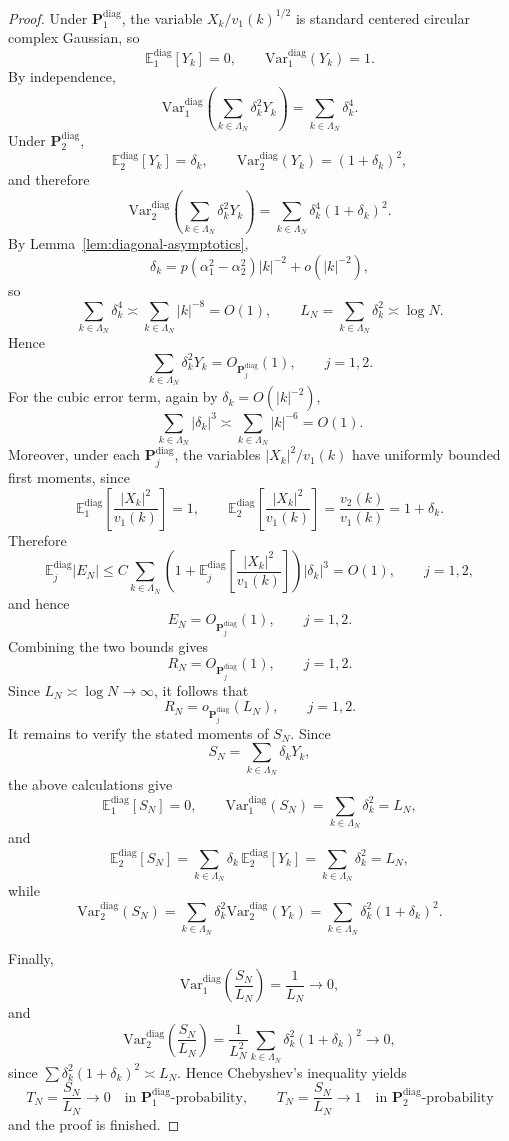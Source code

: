 \documentclass[11pt, reqno]{amsart}
\theoremstyle{remark}
\newcommand{\E}{\mathbb{E}}
\newcommand{\1}{\mathbf{1}}
\newcommand{\Var}{\mathrm{Var}}
\begin{document}
\begin{proof}
Under \(\mathbf P_1^{\mathrm{diag}}\), the variable \(X_k/v_1(k)^{1/2}\) is
standard centered circular complex Gaussian, so
\[
\E_1^{\mathrm{diag}}[Y_k]=0,
\qquad
\Var_1^{\mathrm{diag}}(Y_k)=1.
\]
By independence,
\[
\Var_1^{\mathrm{diag}}\!\left(\sum_{k\in\Lambda_N}\delta_k^2Y_k\right)
=
\sum_{k\in\Lambda_N}\delta_k^4.
\]
Under \(\mathbf P_2^{\mathrm{diag}}\),
\[
\E_2^{\mathrm{diag}}[Y_k]=\delta_k,
\qquad
\Var_2^{\mathrm{diag}}(Y_k)=(1+\delta_k)^2,
\]
and therefore
\[
\Var_2^{\mathrm{diag}}\!\left(\sum_{k\in\Lambda_N}\delta_k^2Y_k\right)
=
\sum_{k\in\Lambda_N}\delta_k^4(1+\delta_k)^2.
\]
By Lemma~\ref{lem:diagonal-asymptotics},
\[
\delta_k=p(\alpha_1^2-\alpha_2^2)|k|^{-2}+o(|k|^{-2}),
\]
so
\[
\sum_{k\in\Lambda_N}\delta_k^4
\asymp
\sum_{k\in\Lambda_N}|k|^{-8}
=O(1),
\qquad
L_N=\sum_{k\in\Lambda_N}\delta_k^2\asymp \log N.
\]
Hence
\[
\sum_{k\in\Lambda_N}\delta_k^2Y_k
=
O_{\mathbf P_j^{\mathrm{diag}}}(1),
\qquad j=1,2.
\]
For the cubic error term, again by \(\delta_k=O(|k|^{-2})\),
\[
\sum_{k\in\Lambda_N}|\delta_k|^3
\asymp
\sum_{k\in\Lambda_N}|k|^{-6}
=
O(1).
\]
Moreover, under each \(\mathbf P_j^{\mathrm{diag}}\), the variables
\(|X_k|^2/v_1(k)\) have uniformly bounded first moments, since
\[
\E_1^{\mathrm{diag}}\!\left[\frac{|X_k|^2}{v_1(k)}\right]=1,
\qquad
\E_2^{\mathrm{diag}}\!\left[\frac{|X_k|^2}{v_1(k)}\right]
=
\frac{v_2(k)}{v_1(k)}=1+\delta_k.
\]
Therefore
\[
\E_j^{\mathrm{diag}}|E_N|
\le
C\sum_{k\in\Lambda_N}
\left(1+\E_j^{\mathrm{diag}}\!\left[\frac{|X_k|^2}{v_1(k)}\right]\right)|\delta_k|^3
=O(1),
\qquad j=1,2,
\]
and hence
\[
E_N=O_{\mathbf P_j^{\mathrm{diag}}}(1),
\qquad j=1,2.
\]
Combining the two bounds gives
\[
R_N=O_{\mathbf P_j^{\mathrm{diag}}}(1),
\qquad j=1,2.
\]
Since \(L_N\asymp \log N\to\infty\), it follows that
\[
R_N=o_{\mathbf P_j^{\mathrm{diag}}}(L_N),
\qquad j=1,2.
\]
It remains to verify the stated moments of \(S_N\). Since
\[
S_N=\sum_{k\in\Lambda_N}\delta_kY_k,
\]
the above calculations give
\[
\E_1^{\mathrm{diag}}[S_N]=0,
\qquad
\Var_1^{\mathrm{diag}}(S_N)=\sum_{k\in\Lambda_N}\delta_k^2=L_N,
\]
and
\[
\E_2^{\mathrm{diag}}[S_N]
=
\sum_{k\in\Lambda_N}\delta_k\,\E_2^{\mathrm{diag}}[Y_k]
=
\sum_{k\in\Lambda_N}\delta_k^2
=
L_N,
\]
while
\[
\Var_2^{\mathrm{diag}}(S_N)
=
\sum_{k\in\Lambda_N}\delta_k^2\Var_2^{\mathrm{diag}}(Y_k)
=
\sum_{k\in\Lambda_N}\delta_k^2(1+\delta_k)^2.
\]

Finally,
\[
\Var_1^{\mathrm{diag}}\!\left(\frac{S_N}{L_N}\right)=\frac1{L_N}\to0,
\]
and
\[
\Var_2^{\mathrm{diag}}\!\left(\frac{S_N}{L_N}\right)
=
\frac{1}{L_N^2}\sum_{k\in\Lambda_N}\delta_k^2(1+\delta_k)^2
\to0,
\]
since \(\sum \delta_k^2(1+\delta_k)^2\asymp L_N\). Hence Chebyshev's inequality
yields
\[
T_N=\frac{S_N}{L_N}\to 0
\quad\text{in \(\mathbf P_1^{\mathrm{diag}}\)-probability},
\qquad
T_N=\frac{S_N}{L_N}\to 1
\quad\text{in \(\mathbf P_2^{\mathrm{diag}}\)-probability}
\]
and the proof is finished.
\end{proof}
\end{document}
